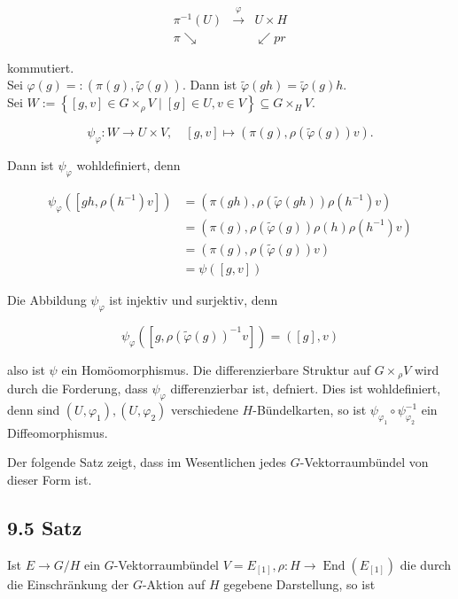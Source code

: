 \documentclass[10pt, letterpaper]{article}
\begin{document}
$$
\begin{array}{ccc}
\pi^{-1}(U) & \xrightarrow{\varphi} & U \times H \\
\pi \searrow & & \swarrow p r
\end{array}
$$

kommutiert.\\
Sei $\varphi(g)=:(\pi(g), \tilde{\varphi}(g))$. Dann ist $\tilde{\varphi}(g h)=\tilde{\varphi}(g) h$.\\
Sei $W:=\left\{[g, v] \in G \times_{\rho} V \mid[g] \in U, v \in V\right\} \subseteq G \times_{H} V$.

$$
\psi_{\varphi}: W \rightarrow U \times V, \quad[g, v] \mapsto(\pi(g), \rho(\tilde{\varphi}(g)) v) .
$$

Dann ist $\psi_{\varphi}$ wohldefiniert, denn

$$
\begin{aligned}
\psi_{\varphi}\left(\left[g h, \rho\left(h^{-1}\right) v\right]\right) & =\left(\pi(g h), \rho(\tilde{\varphi}(g h)) \rho\left(h^{-1}\right) v\right) \\
& =\left(\pi(g), \rho(\tilde{\varphi}(g)) \rho(h) \rho\left(h^{-1}\right) v\right) \\
& =(\pi(g), \rho(\tilde{\varphi}(g)) v) \\
& =\psi([g, v])
\end{aligned}
$$

Die Abbildung $\psi_{\varphi}$ ist injektiv und surjektiv, denn

$$
\psi_{\varphi}\left(\left[g, \rho(\tilde{\varphi}(g))^{-1} v\right]\right)=([g], v)
$$

also ist $\psi$ ein Homöomorphismus. Die differenzierbare Struktur auf $G \times{ }_{\rho} V$ wird durch die Forderung, dass $\psi_{\varphi}$ differenzierbar ist, defniert. Dies ist wohldefiniert, denn sind $\left(U, \varphi_{1}\right),\left(U, \varphi_{2}\right)$ verschiedene $H$-Bündelkarten, so ist $\psi_{\varphi_{1}} \circ \psi_{\varphi_{2}}^{-1}$ ein Diffeomorphismus.

Der folgende Satz zeigt, dass im Wesentlichen jedes $G$-Vektorraumbündel von dieser Form ist.

\subsection*{9.5 Satz}
Ist $E \rightarrow G / H$ ein $G$-Vektorraumbündel $V=E_{[1]}, \rho: H \rightarrow \operatorname{End}\left(E_{[1]}\right)$ die durch die Einschränkung der $G$-Aktion auf $H$ gegebene Darstellung, so ist
\end{document}
